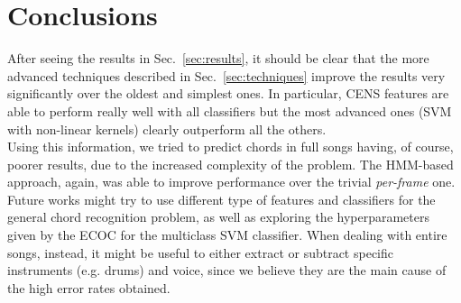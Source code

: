 \section{Conclusions}
\label{sec:conclusions}

After seeing the results in Sec.~\ref{sec:results}, it should be clear that the more advanced techniques described in Sec.~\ref{sec:techniques} improve the results very significantly over the oldest and simplest ones. In particular, CENS features are able to perform really well with all classifiers but the most advanced ones (SVM with non-linear kernels) clearly outperform all the others.\\
%
Using this information, we tried to predict chords in full songs having, of course, poorer results, due to the increased complexity of the problem. The HMM-based approach, again, was able to improve performance over the trivial \textit{per-frame} one. \\
%
Future works might try to use different type of features and classifiers for the general chord recognition problem, as well as exploring the hyperparameters given by the ECOC for the multiclass SVM classifier. When dealing with entire songs, instead, it might be useful to either extract or subtract specific instruments (e.g. drums) and voice, since we believe they are the main cause of the high error rates obtained.
